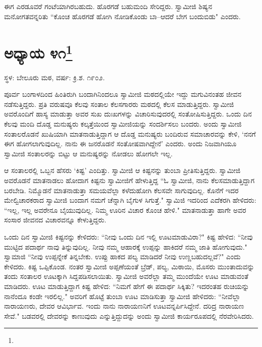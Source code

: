 ಈಗ ಎರಡೂವರೆ ಗಂಟೆಯಾಗಿರಬಹುದು. ಹೊರಗಡೆ ಬಹುಮಂದಿ ಸೇರಿದ್ದರು. ಸ್ವಾಮೀಜಿ ಶಿಷ್ಯನ ಮನೋಗತವನ್ನರಿತು “ಕೊಂಚ ಹೊರಗಡೆ ಹೋಗಿ ನೋಡಿಕೊಂಡು ಬಾ–ಆದರೆ ಬೇಗ ಬಂದುಬಿಡು" ಎಂದರು.

\newpage

\chapter[ಅಧ್ಯಾಯ ೪೧]{ಅಧ್ಯಾಯ ೪೧\protect\footnote{}}

\centerline{ಸ್ಥಳ: ಬೇಲೂರು ಮಠ, ವರ್ಷ: ಕ್ರಿ.ಶ. ೧೯೦೨.}

ಪೂರ್ವ ಬಂಗಾಳದಿಂದ ಹಿಂತಿರುಗಿ ಬಂದಾಗಿನಿಂದಲೂ ಸ್ವಾಮೀಜಿ ಮಠದಲ್ಲಿಯೇ ಇದ್ದು ಮಗುವಿನಂತಹ ಜೀವನ ನಡೆಸುತ್ತಿದ್ದರು. ಪ್ರತಿ ವರುಷವೂ ಕೆಲವು ಸಂತಾಲ ಕೆಲಸಗಾರರು ಮಠದಲ್ಲಿ ಕೆಲಸ ಮಾಡುತ್ತಿದ್ದರು. ಸ್ವಾಮೀಜಿ ಅವರೊಂದಿಗೆ ಹಾಸ್ಯ ಮಾಡುತ್ತಾ ಅವರ ಸುಖ ದುಃಖಗಳನ್ನು ವಿಚಾರಿಸುವುದರಲ್ಲಿ ಸಂತೋಷಿಸುತ್ತಿದ್ದರು. ಒಂದು ದಿನ ಕೆಲವು ಮಂದಿ ದೊಡ್ಡ ಮನುಷ್ಯರು ಕಲ್ಕತ್ತೆಯಿಂದ ಸ್ವಾಮೀಜಿಯನ್ನು ಸಂದರ್ಶಿಸಲು ಬಂದರು. ಅಂದು ಸ್ವಾಮೀಜಿ ಸಂತಾಲರೊಡನೆ ಖುಷಿಯಾಗಿ ಮಾತನಾಡುತ್ತಿದ್ದಾಗ ಆ ದೊಡ್ಡ ಮನುಷ್ಯರು ಬಂದಿರುವ ಸಮಾಚಾರವನ್ನು ಕೇಳಿ, ‘ನನಗೆ ಈಗ ಹೋಗಲಾಗುವುದಿಲ್ಲ. ನಾನು ಈ ಜನರೊಡನೆ ಸಂತೋಷವಾಗಿದ್ದೇನೆ’ ಎಂದರು. ಅಂದು ನಿಜವಾಗಿಯೂ ಸ್ವಾಮೀಜಿ ಸಂತಾಲರನ್ನು ಬಿಟ್ಟು ಆ ಮನುಷ್ಯರನ್ನು ನೋಡಲು ಹೋಗಲೇ ಇಲ್ಲ.

ಆ ಸಂತಾಲರಲ್ಲಿ ಒಬ್ಬನ ಹೆಸರು ‘ಕಿಷ್ಟ’ ಎಂದಿತ್ತು. ಸ್ವಾಮೀಜಿ ಆ ಕಿಷ್ಟನನ್ನು ತುಂಬಾ ಪ್ರೀತಿಸುತ್ತಿದ್ದರು. ಸ್ವಾಮೀಜಿ ಅವರೊಡನೆ ಮಾತನಾಡಲು ಹೋದಾಗ ಕಿಷ್ಟನು ಸ್ವಾಮೀಜಿಗೆ ಹೇಳುತ್ತಿದ್ದ “ಓ ಸ್ವಾಮೀಜಿ, ನಾನು ಕೆಲಸಮಾಡುತ್ತಿದ್ದಾಗ ಬರಬೇಡಿ. ನಿಮ್ಮೊಡನೆ ಮಾತನಾಡುತ್ತಾ ಸಮಯವೆಲ್ಲಾ ಕಳೆದುಹೋಗಿ ಕೆಲಸವೇ ಸಾಗುವುದಿಲ್ಲ. ಕೊನೆಗೆ ಇದರ ಮೇಲ್ವಿಚಾರಕರಾದ ಸ್ವಾಮೀಜಿ ಬಂದಾಗ ನಮಗೆ ಚೆನ್ನಾಗಿ ಬೈಗುಳ ಸಿಗುತ್ತೆ." ಸ್ವಾಮಿಜಿ ಇದರಿಂದ ಎದೆಕರಗಿ ಹೇಳಿದರು: “ಇಲ್ಲ, ಇಲ್ಲ ಅವರೇನೂ ಬೈಯುವುದಿಲ್ಲ. ನಿಮ್ಮ ಊರಿನ ವಿಚಾರ ಕೊಂಚ ಹೇಳಿ." ಮಾತನಾಡುತ್ತಾ ಹಾಗೇ ಅವರ ಸಂಸಾರ ಜೀವನದ ವಿಚಾರವನ್ನೂ ಕೇಳುತ್ತಿದ್ದರು.

ಒಂದು ದಿನ ಸ್ವಾಮೀಜಿ ಕಿಷ್ಟನನ್ನು ಕೇಳಿದರು: “ನೀವು ಒಂದು ದಿನ ಇಲ್ಲಿ ಊಟಮಾಡುವಿರಾ?" ಕಿಷ್ಟ ಹೇಳಿದ: “ನೀವು ಮುಟ್ಟಿದ ಪದಾರ್ಥ ನಾವು ತಿನ್ನುವುದಿಲ್ಲ. ನೀವು ನಮ್ಮ ಆಹಾರಕ್ಕೆ ಉಪ್ಪನ್ನು ಹಾಕಿದರೆ ನಮ್ಮ ಜಾತಿ ಹೋಗುವುದು." ಸ್ವಾಮಾಜಿ “ನೀವು ಉಪ್ಪನ್ನೇಕೆ ತಿನ್ನಬೇಕು. ಉಪ್ಪು ಹಾಕದ ಪಲ್ಯ ಮಾಡಿದರೆ ನೀವು ಉಣ್ಣಬಹುದಲ್ಲವೆ?" ಎಂದು ಕೇಳಿದರು. ಕಿಷ್ಟ ಒಪ್ಪಿಕೊಂಡ. ನಂತರ ಸ್ವಾಮೀಜಿ ಅಪ್ಪಣೆಯಂತೆ ಬ್ರೆಡ್, ಪಲ್ಯ, ಮಿಠಾಯಿ, ಮೊಸರು ಮುಂತಾದುವನ್ನು ತಂದು ಸಂತಾಲರ ಊಟಕ್ಕಾಗಿ ಸಿದ್ದಪಡಿಸಲಾಯಿತು. ಸ್ವಾಮೀಜಿ ಅವರೆಲ್ಲಾ ತಮ್ಮ ಮುಂದೆಯೇ ಊಟ ಮಾಡುವಂತೆ ಮಾಡಿದರು. ಊಟ ಮಾಡುತ್ತಿದ್ದಾಗ ಕಿಷ್ಟ ಹೇಳಿದ: “ನಿಮಗೆ ಹೇಗೆ ಈ ಪದಾರ್ಥ ಸಿಕ್ಕಿತು? ಇದರಂತಹ ರುಚಿಯನ್ನು ನಾನೆಂದೂ ಕಂಡೇ ಇರಲಿಲ್ಲ." ಅವರಿಗೆ ಹೊಟ್ಟೆ ತುಂಬಾ ಊಟ ಮಾಡಿಸುತ್ತಾ ಸ್ವಾಮೀಜಿ ಹೇಳಿದರು: “ನೀವೆಲ್ಲಾ ನಾರಾಯಣರು, ದೇವರ ಆವಿರ್ಭಾವ. ಇಂದು ನಾನು ನಾರಾಯಣನಿಗೆ ಊಟವನ್ನರ್ಪಿಸಿದ್ದೇನೆ. ದರಿದ್ರ ನಾರಾಯಣ ಸೇವೆ." ಬಡವರಲ್ಲಿ ದೇವರನ್ನು ಕಾಣುವುದು ಎನ್ನುತ್ತಿದ್ದುದನ್ನು ಅಂದು ಸ್ವಾಮೀಜಿ ಕಾರ್ಯರೂಪದಲ್ಲಿ ನೆರವೇರಿಸಿದರು.


